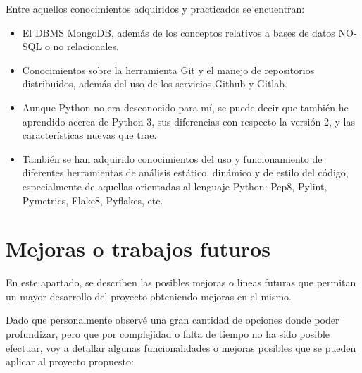 Entre aquellos conocimientos adquiridos y practicados se encuentran:


\begin{itemize}
\item El DBMS MongoDB, además de los conceptos relativos a bases de datos NO-SQL o no relacionales.

\item Conocimientos sobre la herramienta Git y el manejo de repositorios distribuidos, además del uso de los servicios Github y Gitlab.

\item Aunque Python no era desconocido para mí, se puede decir que también he aprendido acerca de Python 3, sus diferencias con respecto la versión 2, y las características nuevas que trae.

\item También se han adquirido conocimientos del uso y funcionamiento de diferentes herramientas de análisis estático, dinámico y de estilo del código, especialmente de aquellas orientadas al lenguaje Python: Pep8, Pylint, Pymetrics, Flake8, Pyflakes, etc.

\end{itemize}

\newpage
\section{Mejoras o trabajos futuros}


En este apartado, se describen las posibles mejoras o líneas futuras que permitan un mayor desarrollo del proyecto obteniendo mejoras en el mismo.


Dado que personalmente observé una gran cantidad de opciones donde poder profundizar, pero que por complejidad o falta de tiempo no ha sido posible efectuar, voy a detallar algunas funcionalidades o mejoras posibles que se pueden aplicar al proyecto propuesto:


